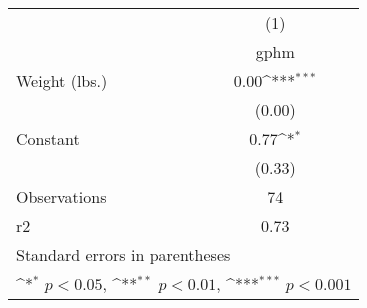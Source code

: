 {
\def\sym#1{\ifmmode^{#1}\else\(^{#1}\)\fi}
\begin{tabular}{l*{1}{c}}
\hline\hline
                    &\multicolumn{1}{c}{(1)}\\
                    &\multicolumn{1}{c}{gphm}\\
\hline
Weight (lbs.)       &        0.00\sym{***}\\
                    &      (0.00)         \\
[1em]
Constant            &        0.77\sym{*}  \\
                    &      (0.33)         \\
\hline
Observations        &          74         \\
r2                  &        0.73         \\
\hline\hline
\multicolumn{2}{l}{\footnotesize Standard errors in parentheses}\\
\multicolumn{2}{l}{\footnotesize \sym{*} \(p<0.05\), \sym{**} \(p<0.01\), \sym{***} \(p<0.001\)}\\
\end{tabular}
}
